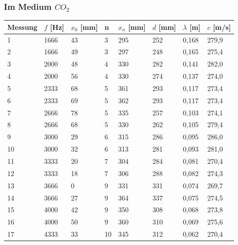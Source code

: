 \documentclass{scrartcl}
\begin{document}
\subsubsection{Im Medium $CO_{2}$}
\begin{table}[h!]
\begin{tabular}{l|l|l|l|l|l|l|l}
Messung & $f$ {[}Hz{]} & $x_{0}$ [mm] & n & $x_{n}$ [mm] & $d$ [mm]   & $\lambda$ [m]      & $c$ [m/s]      \\
\hline
1       & 1666       & 43                & 3 & 295               & 252 & 0,168 & 279,9 \\
2       & 1666       & 49                & 3 & 297               & 248 & 0,165 & 275,4 \\
3       & 2000       & 48                & 4 & 330               & 282 & 0,141 & 282,0 \\
4       & 2000       & 56                & 4 & 330               & 274 & 0,137 & 274,0 \\
5       & 2333       & 68                & 5 & 361               & 293 & 0,117 & 273,4 \\
6       & 2333       & 69                & 5 & 362               & 293 & 0,117 & 273,4 \\
7       & 2666       & 78                & 5 & 335               & 257 & 0,103 & 274,1 \\
8       & 2666       & 68                & 5 & 330               & 262 & 0,105 & 279,4 \\
9       & 3000       & 29                & 6 & 315               & 286 & 0,095 & 286,0 \\
10      & 3000       & 32                & 6 & 313               & 281 & 0,093 & 281,0 \\
11      & 3333       & 20                & 7 & 304               & 284 & 0,081 & 270,4 \\
12      & 3333       & 18                & 7 & 306               & 288 & 0,082 & 274,3 \\
13      & 3666       &  0                & 9 & 331               & 331 & 0,074 & 269,7 \\
14      & 3666       & 27                & 9 & 364               & 337 & 0,075 & 274,5 \\
15      & 4000       & 42                & 9 & 350               & 308 & 0,068 & 273,8 \\
16      & 4000       & 50                & 9 & 360               & 310 & 0,069 & 275,6 \\
17      & 4333       & 33                & 10 & 345               & 312 & 0,062 & 270,4 \\

\end{tabular}
\end{table}
\end{document}
